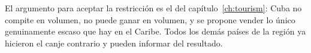 El argumento para aceptar la restricción es el del capítulo~\ref{ch:tourism}: Cuba no compite en
volumen, no puede ganar en volumen, y se propone vender lo único genuinamente escaso que hay en el
Caribe. Todos los demás países de la región ya hicieron el canje contrario y pueden informar del
resultado.
